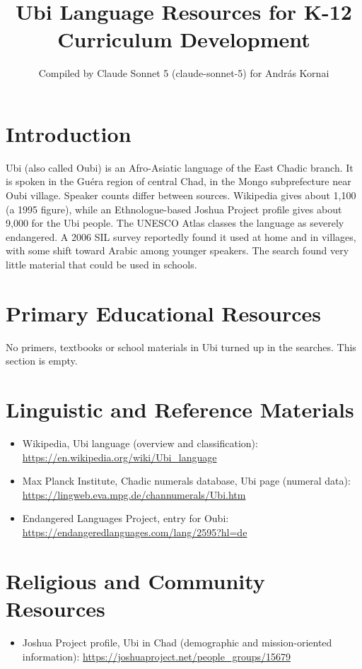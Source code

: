 \documentclass[12pt]{article}
\title{Ubi Language Resources for K-12 Curriculum Development}
\author{Compiled by Claude Sonnet 5 (claude-sonnet-5) for Andr\'as Kornai}
\date{}
\begin{document}
\maketitle

\section{Introduction}
Ubi (also called Oubi) is an Afro-Asiatic language of the East Chadic branch. It is spoken in the Gu\'era region of central Chad, in the Mongo subprefecture near Oubi village. Speaker counts differ between sources. Wikipedia gives about 1,100 (a 1995 figure), while an Ethnologue-based Joshua Project profile gives about 9,000 for the Ubi people. The UNESCO Atlas classes the language as severely endangered. A 2006 SIL survey reportedly found it used at home and in villages, with some shift toward Arabic among younger speakers. The search found very little material that could be used in schools.

\section{Primary Educational Resources}
No primers, textbooks or school materials in Ubi turned up in the searches. This section is empty.

\section{Linguistic and Reference Materials}
\begin{itemize}
\item Wikipedia, Ubi language (overview and classification): \url{https://en.wikipedia.org/wiki/Ubi_language}
\item Max Planck Institute, Chadic numerals database, Ubi page (numeral data): \url{https://lingweb.eva.mpg.de/channumerals/Ubi.htm}
\item Endangered Languages Project, entry for Oubi: \url{https://endangeredlanguages.com/lang/2595?hl=de}
\end{itemize}

\section{Religious and Community Resources}
\begin{itemize}
\item Joshua Project profile, Ubi in Chad (demographic and mission-oriented information): \url{https://joshuaproject.net/people_groups/15679}
\end{itemize}
\end{document}
